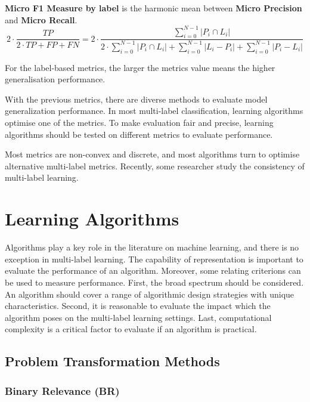 \textbf{Micro F1 Measure by label} is the harmonic mean between \textbf{Micro Precision} and \textbf{Micro Recall}. 
\begin{equation}\label{eq:LabelMicroAccuracy}
2 \cdot \frac{TP}{2 \cdot TP + FP + FN}=2 \cdot \frac{\sum_{i=0}^{N-1} \left|P_i \cap L_i\right|}{2 \cdot
        \sum_{i=0}^{N-1} \left|P_i \cap L_i\right| + \sum_{i=0}^{N-1} \left|L_i - P_i\right| + \sum_{i=0}^{N-1}
        \left|P_i - L_i\right|}
\end{equation}

For the label-based metrics, the larger the metrics value means the higher generalisation performance.

With the previous metrics, there are diverse methods to evaluate model generalization performance. In most multi-label classification, learning algorithms optimise one of the metrics. To make evaluation fair and precise, learning algorithms should be tested on different metrics to evaluate performance.

Most metrics are non-convex and discrete, and most algorithms turn to optimise alternative multi-label metrics. Recently, some researcher study the consistency of multi-label learning\citep{gao2013consistency}. 

\section{Learning Algorithms}

Algorithms play a key role in the literature on machine learning, and there is no exception in multi-label learning. The capability of representation is important to evaluate the performance of an algorithm. Moreover, some relating criterions can be used to measure performance. First, the broad spectrum should be considered. An algorithm should cover a range of algorithmic design strategies with unique characteristics. Second, it is reasonable to evaluate the impact which the algorithm poses on the multi-label learning settings. Last, computational complexity is a critical factor to evaluate if an algorithm is practical.

\subsection{Problem Transformation Methods}

\subsubsection{Binary Relevance (BR)}

